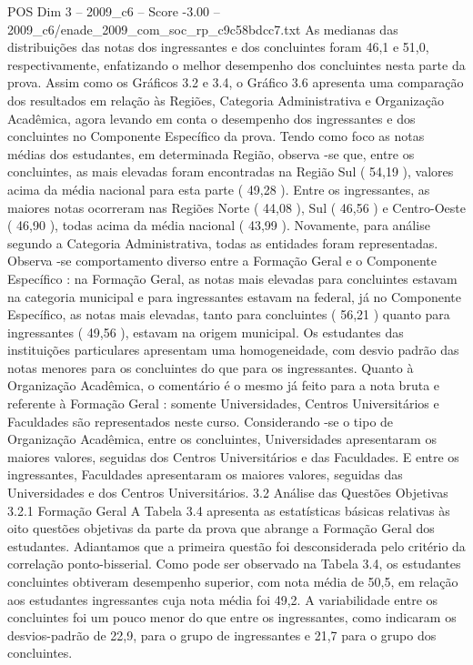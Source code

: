 \begin{textsample}{POS Dim 3 – 2009\_c6 – Score -3.00 – 2009\_c6/enade\_2009\_com\_soc\_rp\_c9c58bdcc7.txt}
As medianas das distribuições das notas dos ingressantes e dos concluintes foram 46,1 e 51,0, respectivamente, enfatizando o melhor desempenho dos concluintes nesta parte da prova.
Assim como os Gráficos 3.2 e 3.4, o Gráfico 3.6 apresenta uma comparação dos resultados em relação às Regiões, Categoria Administrativa e Organização Acadêmica, agora levando em conta o desempenho dos ingressantes e dos concluintes no Componente Específico da prova.
Tendo como foco as notas médias dos estudantes, em determinada Região, observa -se que, entre os concluintes, as mais elevadas foram encontradas na Região Sul ( 54,19 ), valores acima da média nacional para esta parte ( 49,28 ).
Entre os ingressantes, as maiores notas ocorreram nas Regiões Norte ( 44,08 ), Sul ( 46,56 ) e Centro-Oeste ( 46,90 ), todas acima da média nacional ( 43,99 ).
Novamente, para análise segundo a Categoria Administrativa, todas as entidades foram representadas.
Observa -se comportamento diverso entre a Formação Geral e o Componente Específico : na Formação Geral, as notas mais elevadas para concluintes estavam na categoria municipal e para ingressantes estavam na federal, já no Componente Específico, as notas mais elevadas, tanto para concluintes ( 56,21 ) quanto para ingressantes ( 49,56 ), estavam na origem municipal.
Os estudantes das instituições particulares apresentam uma homogeneidade, com desvio padrão das notas menores para os concluintes do que para os ingressantes.
Quanto à Organização Acadêmica, o comentário é o mesmo já feito para a nota bruta e referente à Formação Geral : somente Universidades, Centros Universitários e Faculdades são representados neste curso.
Considerando -se o tipo de Organização Acadêmica, entre os concluintes, Universidades apresentaram os maiores valores, seguidas dos Centros Universitários e das Faculdades.
E entre os ingressantes, Faculdades apresentaram os maiores valores, seguidas das Universidades e dos Centros Universitários. 3.2 Análise das Questões Objetivas 3.2.1 Formação Geral A Tabela 3.4 apresenta as estatísticas básicas relativas às oito questões objetivas da parte da prova que abrange a Formação Geral dos estudantes.
Adiantamos que a primeira questão foi desconsiderada pelo critério da correlação ponto-bisserial.
Como pode ser observado na Tabela 3.4, os estudantes concluintes obtiveram desempenho superior, com nota média de 50,5, em relação aos estudantes ingressantes cuja nota média foi 49,2.
A variabilidade entre os concluintes foi um pouco menor do que entre os ingressantes, como indicaram os desvios-padrão de 22,9, para o grupo de ingressantes e 21,7 para o grupo dos concluintes.

\end{textsample}
